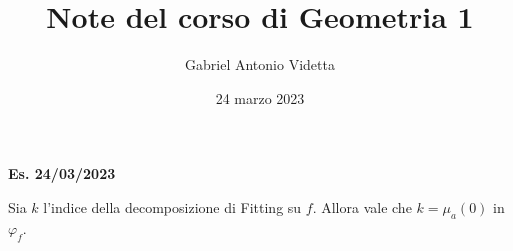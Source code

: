 \documentclass[11pt]{article}
\title{\textbf{Note del corso di Geometria 1}}
\author{Gabriel Antonio Videtta}
\date{24 marzo 2023}
\begin{document}
	
	\maketitle
	
	\begin{center}
		\Large \textbf{Es. 24/03/2023}
	\end{center}
	
	
	
	\begin{remark}
		Sia $k$ l'indice della decomposizione di Fitting su $f$. Allora
		vale che $k = \mu_a(0)$ in $\varphi_f$.
	\end{remark}
	
\end{document}
